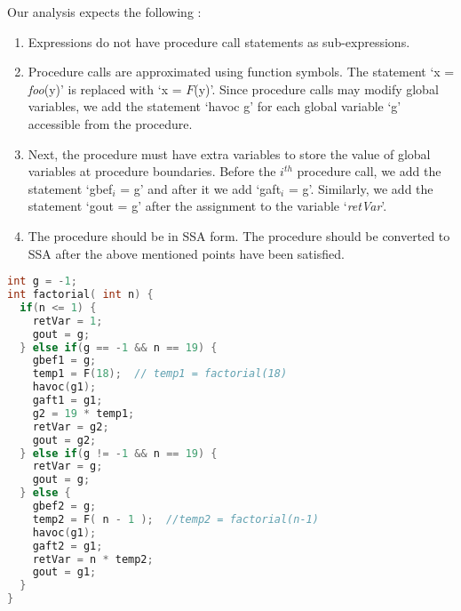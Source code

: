 \documentclass{llncs}
\newcommand{\foo}{\textit{foo}}
\newcommand{\retVar}{\textit{retVar}}
\newcommand{\F}{\mathit{F}}
\begin{document}
Our analysis expects the following :
\begin{enumerate}
\item Expressions do not have procedure call statements as
  sub-expressions. 
\item Procedure calls are approximated using function symbols. The
  statement `x = \foo(y)' is replaced with `x = $\F$(y)'. Since
  procedure calls may modify global variables, we add the statement
  `havoc g' for each global variable `g' accessible from the
  procedure.
  
\item Next, the procedure must have extra variables to store the value
  of global variables at procedure boundaries.
  Before the $\mathit{i^{th}}$
  procedure call, we add the statement `gbef$_i$ = g' and after it we
  add `gaft$_i$ = g'. Similarly, we add the statement `gout = g'
  after the assignment to the variable `\retVar'.
\item The procedure should be in SSA form. The procedure should be
  converted to SSA after the above mentioned points have been
  satisfied.
\end{enumerate}

\begin{lstlisting}[language=c, caption= {Procedure `factorial' from
      Listing~\ref{lst:factorialSimple} converted to the form our
      approach expects. We refer to this procedure as `transformed
      factorial'.}, label=lst:factorialTransformed]
int g = -1;
int factorial( int n) {
  if(n <= 1) {
    retVar = 1;
    gout = g;
  } else if(g == -1 && n == 19) {
    gbef1 = g;
    temp1 = F(18);  // temp1 = factorial(18)
    havoc(g1);
    gaft1 = g1;
    g2 = 19 * temp1;
    retVar = g2;
    gout = g2;
  } else if(g != -1 && n == 19) {
    retVar = g;
    gout = g;
  } else {
    gbef2 = g;
    temp2 = F( n - 1 );  //temp2 = factorial(n-1)
    havoc(g1);    
    gaft2 = g1;
    retVar = n * temp2;
    gout = g1;
  }
}
\end{lstlisting}
\end{document}
